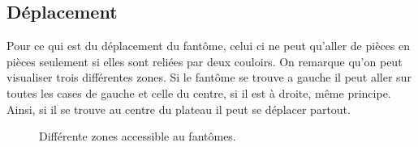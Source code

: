 \documentclass[titlepage]{report}
\begin{document}
\subsection{Déplacement}
\hspace*{0.5cm} Pour ce qui est du déplacement du fantôme, celui ci ne peut qu'aller de pièces en pièces seulement si elles sont reliées par deux couloirs. On remarque qu'on peut visualiser trois différentes zones. Si le fantôme se trouve a gauche il peut aller sur toutes les cases de gauche et celle du centre, si il est à droite, même principe. Ainsi, si il se trouve au centre du plateau il peut se déplacer partout.\\
\begin{figure}[H]%
    \centering
    \qquad
    \caption{Différente zones accessible au fantômes.}%
    \label{fig:example}%
\end{figure}
\end{document}
